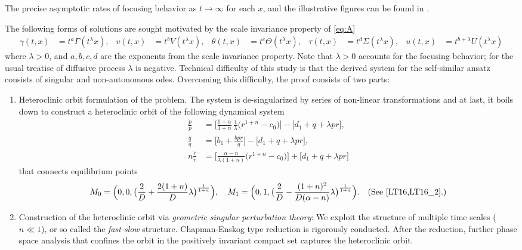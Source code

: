 \documentclass[a4paper,11pt]{article}
\def\dpp{\dot{p}}
\def\dqq{\dot{q}}
\def\drr{\dot{r}}
\begin{document}
The precise asymptotic rates of focusing behavior as $t \rightarrow \infty$ for each $x$, and the illustrative figures can be found in \cite{KLT_2016,LT16,LT16_2}.

The following forms of solutions are sought motivated by the scale invariance property of \eqref{eq:A}
\begin{align*}
 \gamma(t,x) &= t^a\Gamma(t^\lambda x), & v(t,x) &= t^b V(t^\lambda x), &\theta(t,x) &= t^c \Theta(t^\lambda x), &
 \tau(t,x) &= t^d \Sigma(t^\lambda x), & u(t,x) &= t^{b+\lambda} U(t^\lambda x)
\end{align*}
where $\lambda>0$, and $a,b,c,d$ are the exponents from the scale invariance property. Note that $\lambda>0$ accounts for the focusing behavior; for the usual treatise of diffusive process $\lambda$ is negative. Technical difficulty of this study is that the derived system for the self-similar ansatz consists of singular and non-autonomous odes. Overcoming this difficulty, the proof consists of two parts: 
\begin{enumerate}
 \item Heteroclinic orbit formulation of the problem. The system is de-singularized  by series of non-linear transformations and at last, it boils down to construct a heteroclinic orbit of the following dynamical system
\begin{equation} \label{eq:pqrsys}\tag{P}
\begin{aligned}
 \frac{\dpp}{p}&=\Big[\frac{1+\alpha}{1+n}\,\frac{1}{\lambda }\Big(r^{1+n}-c_0\Big)\Big] -\Big[d_1 + q + \lambda pr\Big],\\
 \frac{\dqq}{q}&=\Big[b_1 +\frac{bpr}{q}\Big] -\Big[d_1 + q + \lambda pr\Big],\\
 n\frac{\drr}{r}&=\Big[\frac{\alpha-n}{\lambda(1+n)}\Big(r^{1+n}-c_0\Big)\Big]+\Big[d_1 + q + \lambda pr\Big]
\end{aligned}
\end{equation}
that connects equilibrium points
\begin{align*}
 M_0=\Big(0,0,\big(\frac{2}{D} + \frac{2(1+n)}{D} \lambda\big)^{\frac{1}{1+n}}\Big), \quad M_1=\Big(0,1,\big(\frac{2}{D} -\frac{(1+n)^2}{D(\alpha-n)} \lambda\big)^{\frac{1}{1+n}}\Big). \quad\text{(See \cite{LT16,LT16_2}.)}
\end{align*}
 \item Construction of the heteroclinic orbit via {\it geometric singular perturbation theory}: We exploit the structure of multiple time scales ($n\ll1$), or so called the {\it fast-slow} structure. Chapman-Enskog type reduction is rigorously conducted. After the reduction, further phase space analysis that confines the orbit in the positively invariant compact set captures the heteroclinic orbit.
\end{enumerate}
\end{document}
